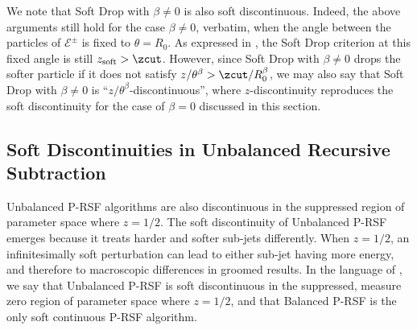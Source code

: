 \documentclass[letterpaper,11pt]{article}
\begin{document}
We note that Soft Drop with \(\beta \neq 0\) is also soft discontinuous.
%
Indeed, the above arguments still hold for the case \(\beta \neq 0\), verbatim, when the angle between the particles of \(\mathcal E^\pm\) is fixed to \(\theta = R_0\).
%
As expressed in , the Soft Drop criterion at this fixed angle is still \(z_{\rm soft} > \zcut\).
%
However, since Soft Drop with \(\beta \neq 0\) drops the softer particle if it does not satisfy \(z / \theta^{\beta} > \zcut/ R_0^\beta\), we may also say that Soft Drop with \(\beta \neq 0\) is ``\(z / \theta^{\beta}\)-discontinuous'', where \(z\)-discontinuity reproduces the soft discontinuity for the case of \(\beta = 0\) discussed in this section.




\subsection{Soft Discontinuities in Unbalanced Recursive Subtraction}
\label{sec:rsf_discont}

Unbalanced P-RSF algorithms are also discontinuous in the suppressed region of parameter space where \(z = 1/2\).
%
The soft discontinuity of Unbalanced P-RSF emerges because it treats harder and softer sub-jets differently.
%
When \(z = 1/2\), an infinitesimally soft perturbation can lead to either sub-jet having more energy, and therefore to macroscopic differences in groomed results.
%
In the language of , we say that Unbalanced P-RSF is soft discontinuous in the suppressed, measure zero region of parameter space where \(z = 1/2\), and that Balanced P-RSF is the only soft continuous P-RSF algorithm.
\end{document}
